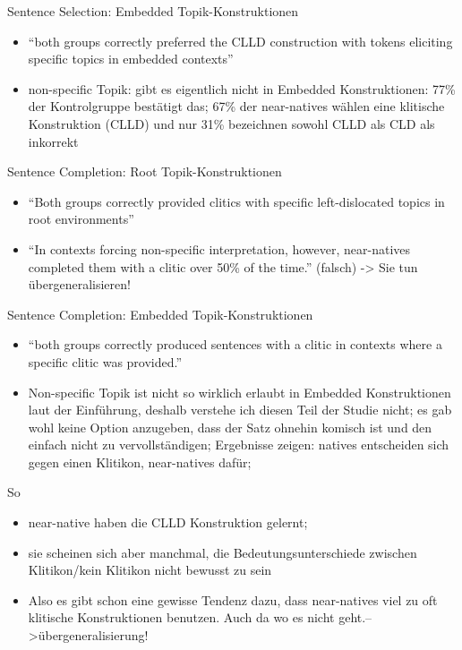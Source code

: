 Sentence Selection: Embedded Topik-Konstruktionen
\begin{itemize}
    \item ``both groups correctly preferred the CLLD construction with tokens eliciting specific topics in embedded contexts''
    \item non-specific Topik: gibt es eigentlich nicht in Embedded Konstruktionen: 77\% der Kontrolgruppe bestätigt das; 67\% der near-natives wählen eine klitische Konstruktion (CLLD) und nur 31\% bezeichnen sowohl CLLD als CLD als inkorrekt
\end{itemize}

Sentence Completion: Root Topik-Konstruktionen
\begin{itemize}
    \item ``Both groups correctly provided clitics with specific left-dislocated topics in root environments''
    \item ``In contexts forcing non-specific interpretation, however, near-natives completed them with a clitic over 50\% of the time.'' (falsch)
       -> Sie tun übergeneralisieren!

\end{itemize}

Sentence Completion: Embedded Topik-Konstruktionen
\begin{itemize}
    \item ``both groups correctly produced sentences with a clitic in contexts where a specific clitic was provided.''
    \item Non-specific Topik ist nicht so wirklich erlaubt in Embedded Konstruktionen laut der Einführung, deshalb verstehe ich diesen Teil der Studie nicht;
        es gab wohl keine Option anzugeben, dass der Satz ohnehin komisch ist und den einfach nicht zu vervollständigen;
        Ergebnisse zeigen: natives entscheiden sich gegen einen Klitikon, near-natives dafür;
\end{itemize}

So
\begin{itemize}
    \item near-native haben die CLLD Konstruktion gelernt;
    \item sie scheinen sich aber manchmal, die Bedeutungsunterschiede zwischen Klitikon/kein Klitikon nicht bewusst zu sein
    \item Also es gibt schon eine gewisse Tendenz dazu, dass near-natives viel zu oft klitische Konstruktionen benutzen. Auch da wo es nicht geht.-->übergeneralisierung!
\end{itemize}

